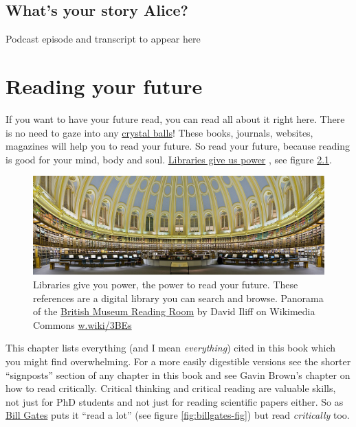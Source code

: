 \documentclass[
]{book}
\begin{document}
\hypertarget{alice-story}{%
\section{What's your story Alice?}\label{alice-story}}

Podcast episode and transcript to appear here

\hypertarget{reading}{%
\chapter{Reading your future}\label{reading}}

If you want to have your future read, you can read all about it right here. There is no need to gaze into any \href{https://en.wikipedia.org/wiki/Crystal_ball}{crystal balls}! These books, journals, websites, magazines will help you to read your future. So read your future, because reading is good for your mind, body and soul. \href{https://en.wikipedia.org/wiki/A_Design_for_Life}{Libraries give us power} \citep{designforlife, librariesgaveuspower}, see figure \ref{fig:library-power-fig}.

\begin{figure}

{\centering \includegraphics[width=1\linewidth]{images/Libraries_Give_Us_Power} 

}

\caption{Libraries give you power, the power to read your future. These references are a digital library you can search and browse. Panorama of the \href{https://en.wikipedia.org/wiki/British_Museum_Reading_Room}{British Museum Reading Room} by David Iliff on Wikimedia Commons \href{https://w.wiki/3BEs}{w.wiki/3BEs}}\label{fig:library-power-fig}
\end{figure}



This chapter lists everything (and I mean \emph{everything}) cited in this book which you might find overwhelming. For a more easily digestible versions see the shorter ``signposts'' section of any chapter in this book and see Gavin Brown's chapter on how to read critically. Critical thinking and critical reading are valuable skills, not just for PhD students and not just for reading scientific papers either. So as \href{https://en.wikipedia.org/wiki/Bill_Gates}{Bill Gates} puts it ``read a lot'' (see figure \ref{fig:billgates-fig}) but read \emph{critically} too. \citep{howtoread}
\end{document}
